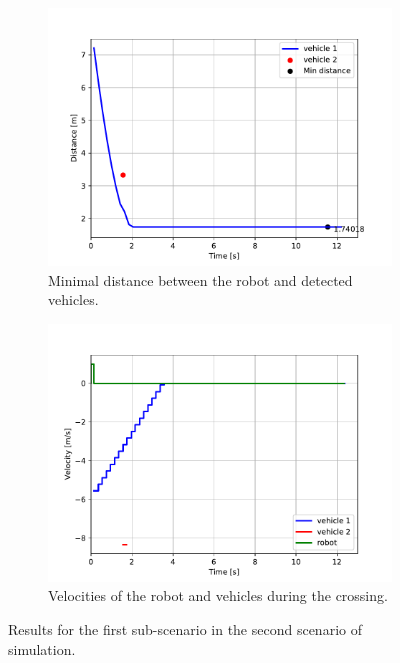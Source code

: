             \begin{figure}[H]
                \centering
                \begin{subfigure}{0.49\linewidth}
                    \centering
                    \includegraphics[trim={24 8 35 41}, clip, width=\linewidth]{images/simulations/scene2_1_dist.pdf}
                    \caption{Minimal distance between the robot and detected vehicles.}
                \end{subfigure}
                \begin{subfigure}{0.49\linewidth}
                    \centering
                    \includegraphics[trim={21 8 40 41}, clip, width=\linewidth]{images/simulations/scene2_1_vel.pdf}
                    \caption{Velocities of the robot and vehicles during the crossing.}
                \end{subfigure}
                \caption{Results for the first sub-scenario in the second scenario of simulation.}
                \label{fig:scene2_1_graphs}
            \end{figure}
